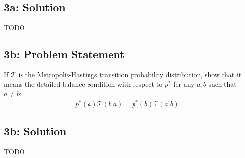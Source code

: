 \documentclass[10pt]{article}
\newcommand{\officialdirections}[1]{{\color{blue} #1}}
\begin{document}
\subsection{3a: Solution}
TODO

\newpage
\officialdirections{
\subsection*{3b: Problem Statement}
If $\mathcal{T}$ is the Metropolis-Hastings transition probability distribution, show that it means the detailed balance condition with respect to $p^*$ for any $a,b$ such that $a \neq b$:
\begin{align}
p^*( a) \mathcal{T}( b | a)  = p^*(b) \mathcal{T}( a | b)
\end{align}
}

\subsection{3b: Solution}
TODO
\end{document}
